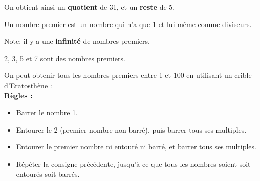 \documentclass[../€Cours-complet/Cours-complet]{subfiles}
\begin{document}
\begin{exemple}
	On obtient ainsi un \textbf{quotient} de 31, et un \textbf{reste} de 5.
\end{exemple}

\begin{cours}
	Un \uline{nombre premier} est un nombre qui n'a que 1 et lui même comme diviseurs.
\end{cours}

Note: il y a une \textbf{infinité} de nombres premiers.

\begin{exemple}
	2, 3, 5 et 7 sont des nombres premiers.
\end{exemple}

\newpage

On peut obtenir tous les nombres premiers entre 1 et 100 en utilisant un \uline{crible d'Eratosthène} : \\

\textbf{Règles :}
\begin{itemize} \setlength\itemsep{0.3em}
	\item Barrer le nombre 1.
	\item Entourer le 2 (premier nombre non barré), puis barrer tous ses multiples.
	\item Entourer le premier nombre ni entouré ni barré, et barrer tous ses multiples.
	\item Répéter la consigne précédente, jusqu'à ce que tous les nombres soient soit entourés soit barrés.
\end{itemize}
\vspace{0.7cm}
\end{document}
